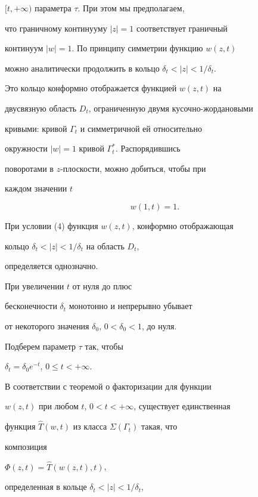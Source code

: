$[t,+\infty)$ параметра $\tau$. При этом мы предполагаем,


что граничному континууму $|z|=1$ соответствует граничный


континуум $|w|=1$. По принципу симметрии функцию $w(z,t)$


можно аналитически продолжить в кольцо $\delta_{t}<|z|<1/\delta_{t}$.


Это кольцо конформно отображается функцией $w(z,t)$ на


двусвязную область $D_{t}$, ограниченную двумя кусочно-жордановыми


кривыми: кривой $\Gamma_{t}$ и симметричной ей относительно


окружности $|w|=1$ кривой $\Gamma_{t}^{*}$. Распорядившись


поворотами в $z$-плоскости, можно добиться, чтобы при


каждом значении $t$


\begin{equation}


w(1,t)=1.


\end{equation}


При условии (4) функция $w(z,t)$, конформно отображающая


кольцо $\delta_{t}<|z|<1/\delta_{t}$ на область $D_{t}$, 


определяется однозначно.





При увеличении $t$ от нуля до плюс 


бесконечности $\delta_{t}$ монотонно и непрерывно убывает 


от некоторого значения $\delta_{0}$, $0<\delta_{0}<1$, до нуля. 


Подберем параметр $\tau$ так, чтобы


$\delta_{t}=\delta_{0}e^{-t}$, $0\le t<+\infty$.





В соответствии с теоремой о факторизации для функции


$w(z,t)$ при любом $t$, $0<t<+\infty$, существует единственная


функция $\widehat{T}(w,t)$ из класса $\Sigma(\Gamma_{t})$ такая, что


композиция


$\Phi(z,t)=\widehat{T}(w(z,t),t)$,


определенная в кольце $\delta_{t}<|z|<1/\delta_{t}$, 


